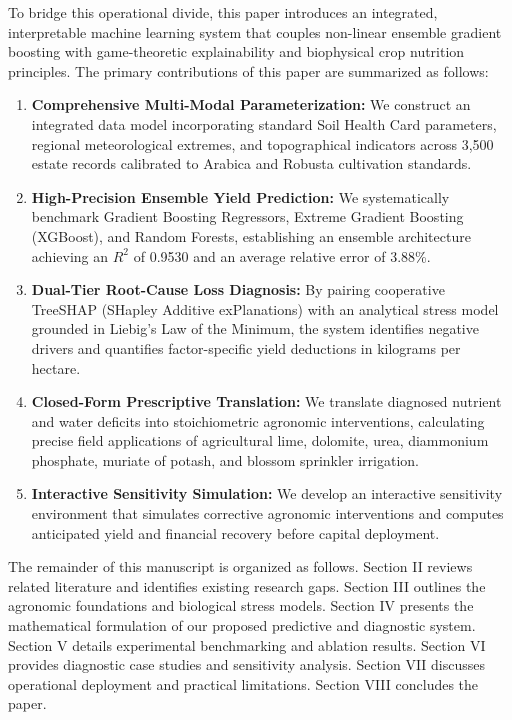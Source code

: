 \documentclass[conference]{IEEEtran}
\begin{document}
To bridge this operational divide, this paper introduces an integrated, interpretable machine learning system that couples non-linear ensemble gradient boosting with game-theoretic explainability and biophysical crop nutrition principles. The primary contributions of this paper are summarized as follows:
\begin{enumerate}
    \item \textbf{Comprehensive Multi-Modal Parameterization:} We construct an integrated data model incorporating standard Soil Health Card parameters, regional meteorological extremes, and topographical indicators across 3,500 estate records calibrated to Arabica and Robusta cultivation standards.
    \item \textbf{High-Precision Ensemble Yield Prediction:} We systematically benchmark Gradient Boosting Regressors, Extreme Gradient Boosting (XGBoost), and Random Forests, establishing an ensemble architecture achieving an $R^2$ of 0.9530 and an average relative error of 3.88\%.
    \item \textbf{Dual-Tier Root-Cause Loss Diagnosis:} By pairing cooperative TreeSHAP (SHapley Additive exPlanations) with an analytical stress model grounded in Liebig's Law of the Minimum, the system identifies negative drivers and quantifies factor-specific yield deductions in kilograms per hectare.
    \item \textbf{Closed-Form Prescriptive Translation:} We translate diagnosed nutrient and water deficits into stoichiometric agronomic interventions, calculating precise field applications of agricultural lime, dolomite, urea, diammonium phosphate, muriate of potash, and blossom sprinkler irrigation.
    \item \textbf{Interactive Sensitivity Simulation:} We develop an interactive sensitivity environment that simulates corrective agronomic interventions and computes anticipated yield and financial recovery before capital deployment.
\end{enumerate}

The remainder of this manuscript is organized as follows. Section II reviews related literature and identifies existing research gaps. Section III outlines the agronomic foundations and biological stress models. Section IV presents the mathematical formulation of our proposed predictive and diagnostic system. Section V details experimental benchmarking and ablation results. Section VI provides diagnostic case studies and sensitivity analysis. Section VII discusses operational deployment and practical limitations. Section VIII concludes the paper.
\end{document}
